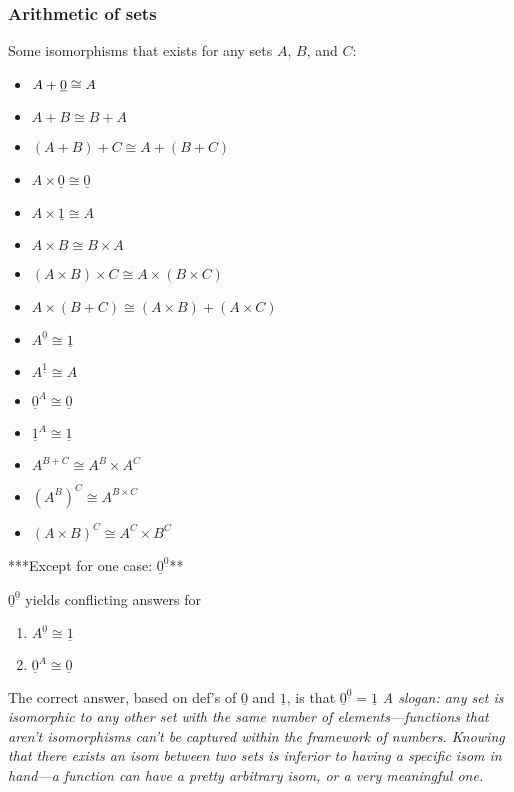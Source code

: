 \documentclass{article}
\begin{document}
\subsubsection{Arithmetic of sets}
Some isomorphisms that exists for any sets $A$, $B$, and $C$:
\begin{multicols}{2}
\begin{itemize}
\item $A + \text{\underline{0}} \cong A$
\item $A + B \cong B + A$
\item $(A + B) + C \cong A + (B + C)$
\item $A \times \underline{0} \cong \underline{0}$
\item $A \times \underline{1} \cong A$
\item $A \times B \cong B \times A$
\item $(A \times B) \times C \cong A \times (B \times C)$
\item $A \times (B + C) \cong (A \times B) + (A \times C)$
\item $A^{\underline{0}} \cong \underline{1}$
\item $A^{\underline{1}} \cong A$
\item $\underline{0}^{A} \cong \underline{0}$
\item $\underline{1}^{A} \cong \underline{1}$
\item $A^{B + C} \cong A^{B} \times A^{C}$
\item $(A^{B})^{C} \cong A^{B \times C}$
\item $(A \times B)^{C} \cong A^{C} \times B^{C}$
\end{itemize}
\end{multicols}
\begin{center}
***\qquad Except for one case: $\underline{0}^{\underline{0}}$\qquad ***
\end{center}
$\underline{0}^{\underline{0}}$ yields conflicting answers for
\begin{enumerate}
\item $A^{\underline{0}} \cong \underline{1}$
\item $\underline{0}^{A} \cong \underline{0}$
\end{enumerate}
The correct answer, based on def's of $\underline{0}$ and $\underline{1}$, is that $\underline{0}^{\underline{0}} = \underline{1}$
\emph{A slogan: any set is isomorphic to any other set with the same number of elements---functions that aren't isomorphisms can't be captured within the framework of numbers. Knowing that there exists an isom between two sets is inferior to having a specific isom in hand---a function can have a pretty arbitrary isom, or a very meaningful one.}
\end{document}
